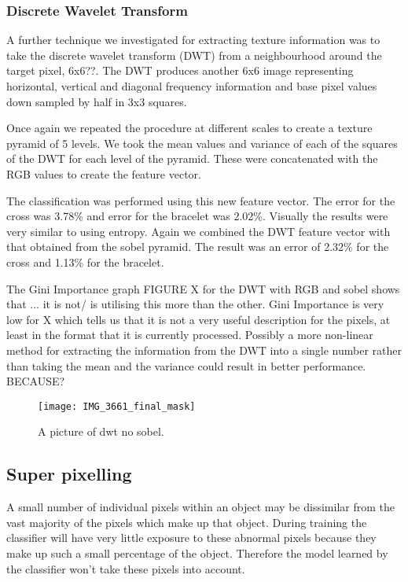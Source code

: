 \documentclass[12pt]{IIBproject}
\begin{document}
\subsubsection{Discrete Wavelet Transform}

A further technique we investigated for extracting texture information was to take the discrete wavelet transform (DWT) from a neighbourhood around the target pixel,  6x6??. The DWT produces another 6x6 image representing horizontal, vertical and diagonal frequency information and base pixel values down sampled by half in 3x3 squares. 

Once again we repeated the procedure at different scales to create a texture pyramid of 5 levels. We took the mean values and variance of each of the squares of the DWT for each level of the pyramid. These were concatenated with the RGB values to create the feature vector. 

The classification was performed using this new feature vector. The error for the cross was 3.78\% and error for the bracelet was 2.02\%. Visually the results were very similar to using entropy. Again we combined the DWT feature vector with that obtained from the sobel pyramid. The result was an error of 2.32\% for the cross and 1.13\% for the bracelet. 

The Gini Importance graph FIGURE X for the DWT with RGB and sobel shows that ... it is not/ is utilising this more than the other. Gini Importance is very low for X which tells us that it is not a very useful description for the pixels, at least in the format that it is currently processed. Possibly a more non-linear method for extracting the information from the DWT into a single number rather than taking the mean and the variance could result in better performance. BECAUSE?

\begin{figure}[H]
  \caption{A picture of dwt no sobel.}
  \centering
    \texttt{[image: IMG\_3661\_final\_mask]}
\end{figure}

\subsection{Super pixelling}
A small number of individual pixels within an object may be dissimilar from the vast majority of the pixels which make up that object. During training the classifier will have very little exposure to these abnormal pixels because they make up such a small percentage of the object. Therefore the model learned by the classifier won't take these pixels into account. 
\end{document}
